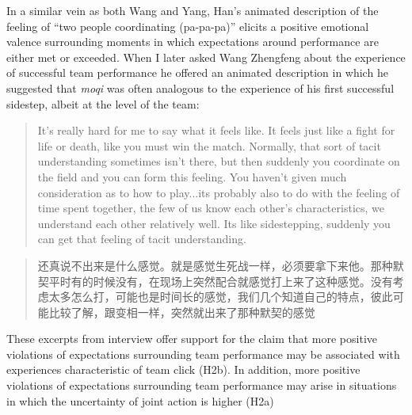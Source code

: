 \begin{CJK}{UTF8}{gbsn}
In a similar vein as both Wang and Yang, Han's animated description of the feeling of ``two people coordinating (pa-pa-pa)'' elicits a positive emotional valence surrounding moments in which expectations around performance are either met or exceeded. When I later asked Wang Zhengfeng about the experience of successful team performance he offered an animated description in which he suggested that \textit{moqi} was often analogous to the experience of his first successful sidestep, albeit at the level of the team:

  \begin{quote}
    It's really hard for me to say what it feels like.  It feels just like a fight for life or death, like you must win the match.  Normally, that sort of tacit understanding sometimes isn't there, but then suddenly you coordinate on the field and you can form this feeling.  You haven't given much consideration as to how to play...its probably also to do with the feeling of time spent together, the few of us know each other's characteristics, we understand each other relatively well.  Its like sidestepping, suddenly you can get that feeling of tacit understanding.
  \end{quote}

  \begin{quote}
    还真说不出来是什么感觉。就是感觉生死战一样，必须要拿下来他。那种默契平时有的时候没有，在现场上突然配合就感觉打上来了这种感觉。没有考虑太多怎么打，可能也是时间长的感觉，我们几个知道自己的特点，彼此可能比较了解，跟变相一样，突然就出来了那种默契的感觉
  \end{quote}

These excerpts from interview offer support for the claim that more positive violations of expectations surrounding team performance may be associated with experiences characteristic of team click (H2b).  In addition, more positive violations of expectations surrounding team performance may arise in situations in which the uncertainty of joint action is higher (H2a)




\end{CJK}
